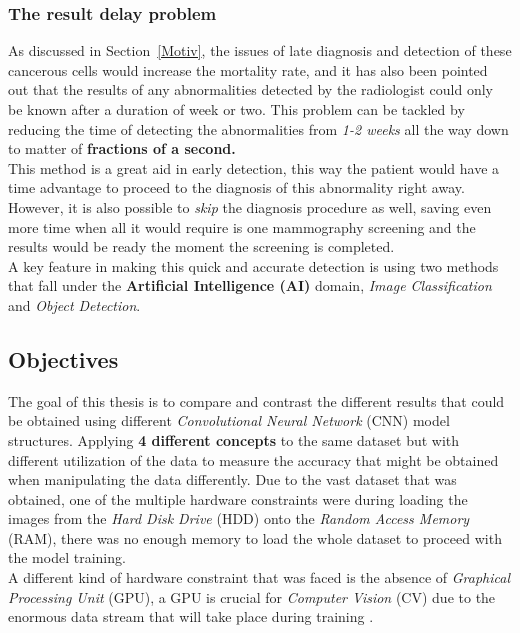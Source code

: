 \documentclass[12pt]{extarticle}
\begin{document}
	\subsubsection{The result delay problem}\label{delay problem}
	As discussed in Section~\ref{Motiv}, the issues of late diagnosis and detection of these cancerous cells would increase the mortality rate, and it has also been pointed out that the results of any abnormalities detected by the radiologist could only be known after a duration of week or two. This problem can be tackled by reducing the time of detecting the abnormalities from \emph{1-2 weeks} all the way down to matter of \textbf{fractions of a second.}\\[5mm]
	This method is a great aid in early detection, this way the patient would have a time advantage to proceed to the diagnosis of this abnormality right away. However, it is also possible to \emph{skip} the diagnosis procedure as well, saving even more time when all it would require is one mammography screening and the results would be ready the moment the screening is completed.\\[5mm]
	A key feature in making this quick and accurate detection is using two methods that fall under the \textbf{Artificial Intelligence (AI)} domain, \emph{Image Classification} and \emph{Object Detection}.
	
	\subsection{Objectives}\label{Obj}
	The goal of this thesis is to compare and contrast the different results that could be obtained using different \emph{Convolutional Neural Network} (CNN) model structures. Applying \textbf{4 different concepts} to the same dataset but with different utilization of the data to measure the accuracy that might be obtained when manipulating the data differently. Due to the vast dataset that was obtained, one of the multiple hardware constraints were during loading the images from the \emph{Hard Disk Drive} (HDD) onto the \emph{Random Access Memory} (RAM), there was no enough memory to load the whole dataset to proceed with the model training. \\[5mm]
	A different kind of hardware constraint that was faced is the absence of \emph{Graphical Processing Unit} (GPU), a GPU is crucial for \emph{Computer Vision} (CV) due to the enormous data stream that will take place during training \cite{GPU}.
\end{document}
